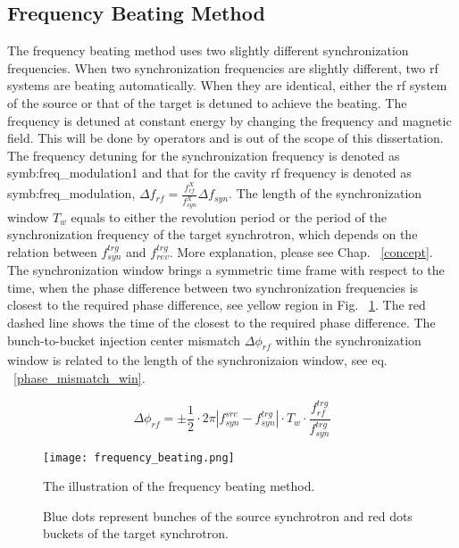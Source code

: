 
\subsection{Frequency Beating Method}
\label{subsec:beating}

The frequency beating method uses two slightly different synchronization frequencies. When two synchronization frequencies are slightly different, two rf systems are beating automatically. When they are identical, either the rf system of the source or that of the target is detuned to achieve the beating. The frequency is detuned at constant energy by changing the frequency and magnetic field. This will be done by operators and is out of the scope of this dissertation. The frequency detuning for the synchronization frequency is denoted as \gls{symb:freq_modulation1} and that for the cavity rf frequency is denoted as \gls{symb:freq_modulation},  $\Delta f_\mathit{rf}=\frac{f_{\mathit{rf}}^\mathit{X}}{f_{\mathit{syn}}^\mathit{X}} \Delta f_\mathit{syn}$. The length of the synchronization window $T_\mathit{w}$ equals to either the revolution period or the period of the synchronization frequency of the target synchrotron, which depends on the relation between $f_{\mathit{syn}}^\mathit{trg}$ and $f_{\mathit{rev}}^\mathit{trg}$. More explanation, please see Chap. ~\ref{concept}. The synchronization window brings a symmetric time frame with respect to the time, when the phase difference between two synchronization frequencies is closest to the required phase difference, see yellow region in Fig. ~\ref{frequency_beat}. The red dashed line shows the time of the closest to the required phase difference. The bunch-to-bucket injection center mismatch $\Delta \phi_\mathit{rf}$ within the synchronization window is related to the length of the synchronizaion window, see eq. ~\ref{phase_mismatch_win}. %

\begin{equation}
\Delta \phi_\mathit{rf}=\pm \frac{1}{2}\cdot 2\pi|f_{\mathit{syn}}^\mathit{src}-f_{\mathit{syn}}^\mathit{trg}|\cdot T_\mathit{w} \cdot \frac{f_{\mathit{rf}}^\mathit{trg}}{f_{\mathit{syn}}^\mathit{trg}}\label{phase_mismatch_win}
\end{equation}
\begin{figure}[!htb]
   \centering   
   \texttt{[image: frequency\_beating.png]}
   \caption{The illustration of the frequency beating method.}
	\caption*{Blue dots represent bunches of the source synchrotron and red dots buckets of the target synchrotron.}
   \label{frequency_beat}
\end{figure}

